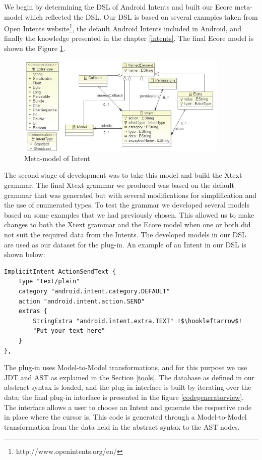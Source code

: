 We begin by determining the DSL of Android Intents and built our Ecore meta-model which reflected the DSL. Our DSL is based on several examples taken from Open Intents website\footnote{http://www.openintents.org/en/}, the default Android Intents included in Android, and finally the knowledge presented in the chapter \ref{intents}. The final Ecore model is shown the Figure \ref{meta-model}.

\begin{figure}[t]
\label{meta-model}
  \centering
    \includegraphics[width=0.9\textwidth]{metamodel}
  \caption{Meta-model of Intent}
\end{figure}

The second stage of development was to take this model and build the Xtext grammar. The final Xtext grammar we produced was based on the default grammar that was generated but with several modifications for simplification and the use of enumerated types. To test the grammar we developed several models based on some examples that we had previously chosen. This allowed us to make changes to both the Xtext grammar and the Ecore model when one or both did not suit the required data from the Intents. The developed models in our DSL are used as our dataset for the plug-in. An example of an Intent in our DSL is shown below:

{\footnotesize\begin{lstlisting}[escapechar=!]
ImplicitIntent ActionSendText {
	type "text/plain"
	category "android.intent.category.DEFAULT"
	action "android.intent.action.SEND"
	extras {
		StringExtra "android.intent.extra.TEXT" !$\hookleftarrow$!
		"Put your text here"
	}
},
\end{lstlisting}}

The plug-in uses Model-to-Model transformations, and for this purpose we use JDT and AST as explained in the Section \ref{tools}. The database as defined in our abstract syntax is loaded, and the plug-in interface is built by iterating over the data; the final plug-in interface is presented in the figure \ref{codegeneratorview}. The interface allows a user to choose an Intent and generate the respective code in place where the cursor is. This code is generated through a Model-to-Model transformation from the data held in the abstract syntax to the AST nodes.

